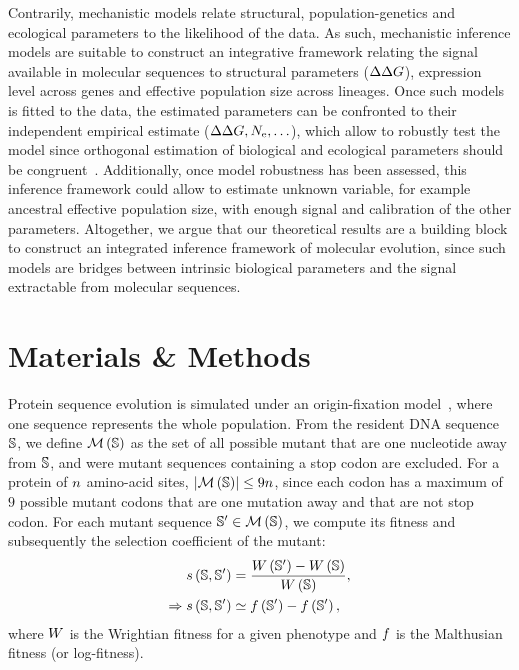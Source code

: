 Contrarily, mechanistic models relate structural, population-genetics and ecological parameters to the likelihood of the data.
As such, mechanistic inference models are suitable to construct an integrative framework relating the signal available in molecular sequences to structural parameters ($\Delta \Delta G$), expression level across genes and effective population size across lineages.
Once such models is fitted to the data, the estimated parameters can be confronted to their independent empirical estimate ($\Delta \Delta G, N_{\mathrm{e}}, \hdots$), which allow to robustly test the model since orthogonal estimation of biological and ecological parameters should be congruent~\citep{Dasmeh2014}.
Additionally, once model robustness has been assessed, this inference framework could allow to estimate unknown variable, for example ancestral effective population size, with enough signal and calibration of the other parameters.
Altogether, we argue that our theoretical results are a building block to construct an integrated inference framework of molecular evolution, since such models are bridges between intrinsic biological parameters and the signal extractable from molecular sequences.


\section{Materials \& Methods}
Protein sequence evolution is simulated under an origin-fixation model~\citep{McCandlish2014}, where one sequence represents the whole population.
From the resident \acrshort{DNA} sequence $\mathbb{S}$, we define $\mathcal{M}\left(\mathbb{S}\right)$ as the set of all possible mutant that are one nucleotide away from $\mathbb{S}$, and were mutant sequences containing a stop codon are excluded.
For a protein of $n$ amino-acid sites, $\left| \mathcal{M}\left(\mathbb{S}\right) \right| \leq 9 n$, since each codon has a maximum of $9$ possible mutant codons that are one mutation away and that are not stop codon.
For each mutant sequence $\mathbb{S}' \in \mathcal{M}\left(\mathbb{S}\right)$, we compute its fitness and subsequently the selection coefficient of the mutant:
\begin{align}
    s \left( \mathbb{S},\mathbb{S}'\right) & = \dfrac{ W \left(\mathbb{S}' \right) - W \left(\mathbb{S}\right) }{ W \left( \mathbb{S}\right)}, \\
   \Rightarrow s \left( \mathbb{S},\mathbb{S}'\right) & \simeq  f \left(\mathbb{S}' \right) -   f \left(\mathbb{S}' \right),
\end{align}
where $W$ is the Wrightian fitness for a given phenotype and $f $ is the Malthusian fitness (or log-fitness).

